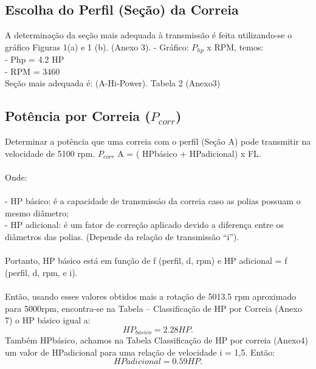 \documentclass[11pt,a4paper]{report}
\begin{document}
\subsection{Escolha do Perfil (Se\c{c}\~ao) da Correia}
A determina\c{c}\~ao da se\c{c}\~ao mais adequada à transmiss\~ao \'e feita utilizando-se
o gr\'afico Figuras 1(a) e 1 (b). (Anexo 3).
- Gr\'afico: $P_{hp}$ x RPM, temos:\\
- Php = 4.2 HP\\
- RPM = 3460\\
Se\c{c}\~ao mais adequada \'e: (A-Hi-Power). Tabela 2 (Anexo3)
\subsection{Pot\^encia por Correia ($P_{corr}$)}
Determinar a pot\^encia que uma correia com o perfil (Se\c{c}\~ao A) pode
transmitir na velocidade de 5100 rpm.
$P_{corr}$ A = ( HPb\'asico + HPadicional) x FL.\\\\
Onde:\\\\
- HP b\'asico: \'e a capacidade de transmiss\'ao da correia caso as polias possuam o mesmo di\^ametro;\\
- HP adicional: \'e um fator de corre\c{c}\~ao aplicado devido a diferen\c{c}a entre os
di\^ametros das polias. (Depende da rela\c{c}\~ao de transmiss\~ao “i”).\\\\
Portanto, HP b\'asico est\'a em fun\c{c}\~ao de f (perfil, d, rpm) e HP adicional = f (perfil,
d, rpm, e i).\\\\
Ent\~ao, usando esses valores obtidos mais a rota\c{c}\~ao de 5013.5 rpm aproximado para 5000rpm, encontra-se na Tabela – Classificação de HP por Correia (Anexo 7) o HP b\'asico igual a:\\
$$HP_{basico} = 2.28 HP.$$
Tamb\'em HPb\'asico, achamos na Tabela Classifica\c{c}\~ao de HP por correia
(Anexo4) um valor de HPadicional para uma relação de velocidade i = 1,5. Ent\~ao:\\
$$HPadicional = 0.59 HP.$$
\end{document}
